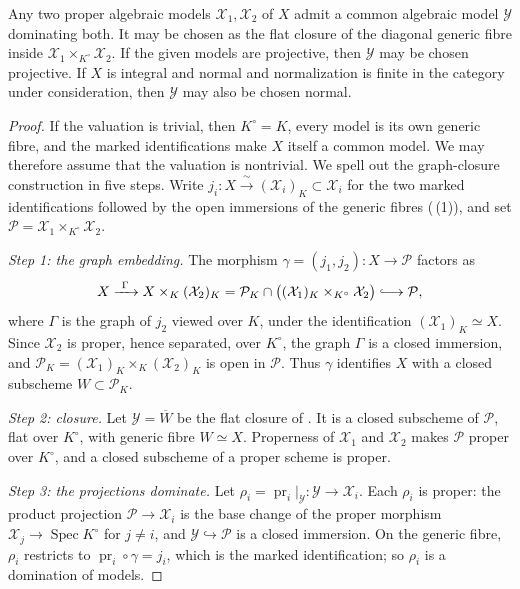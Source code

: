 \begin{proposition}\label{prop:common-domination}
Any two proper algebraic models $\mathcal X_1,\mathcal X_2$ of $X$ admit a
common algebraic model $\mathcal Y$ dominating both.  It may be chosen as
the flat closure of the diagonal generic fibre inside
$\mathcal X_1\times_{K^\circ}\mathcal X_2$.  If the given models are
projective, then $\mathcal Y$ may be chosen projective.  If $X$ is integral
and normal and normalization is finite in the category under consideration,
then $\mathcal Y$ may also be chosen normal.
\end{proposition}
\begin{proof}
If the valuation is trivial, then $K^\circ=K$, every model is its own generic
fibre, and the marked identifications make $X$ itself a common model.  We may
therefore assume that the valuation is nontrivial.  We spell out the
graph-closure construction in five steps.  Write
$j_i:X\xrightarrow{\ \sim\ }(\mathcal X_i)_K\subset\mathcal X_i$ for the
two marked identifications followed by the open immersions of the generic
fibres (\,(1)), and set
$\mathcal P=\mathcal X_1\times_{K^\circ}\mathcal X_2$.

\emph{Step 1: the graph embedding.}  The morphism
$\gamma=(j_1,j_2):X\to\mathcal P$ factors as
\[
   X\xrightarrow{\ \Gamma\ }
   X\times_K(\mathcal X_2)_K
   =\mathcal P_K\cap\bigl((\mathcal X_1)_K\times_{K^\circ}\mathcal X_2\bigr)
   \lhook\joinrel\longrightarrow\mathcal P,
\]
where $\Gamma$ is the graph of $j_2$ viewed over $K$, under the
identification $(\mathcal X_1)_K\simeq X$.  Since $\mathcal X_2$ is proper,
hence separated, over $K^\circ$, the graph $\Gamma$ is a closed immersion,
and $\mathcal P_K=(\mathcal X_1)_K\times_K(\mathcal X_2)_K$ is open in
$\mathcal P$.  Thus $\gamma$ identifies $X$ with a closed subscheme
$W\subset\mathcal P_K$.

\emph{Step 2: closure.}  Let $\mathcal Y=\overline W$ be the flat closure
of .  It is a closed subscheme of
$\mathcal P$, flat over $K^\circ$, with generic fibre $W\simeq X$.
Properness of $\mathcal X_1$ and $\mathcal X_2$ makes $\mathcal P$ proper
over $K^\circ$, and a closed subscheme of a proper scheme is proper.

\emph{Step 3: the projections dominate.}  Let
$\rho_i=\operatorname{pr}_i|_{\mathcal Y}:\mathcal Y\to\mathcal X_i$.  Each
$\rho_i$ is proper: the product projection
$\mathcal P\to\mathcal X_i$ is the base change of the proper morphism
$\mathcal X_j\to\operatorname{Spec}K^\circ$ for $j\ne i$, and
$\mathcal Y\hookrightarrow\mathcal P$ is a closed immersion.  On the
generic fibre, $\rho_i$ restricts to
$\operatorname{pr}_i\circ\gamma=j_i$, which is the marked identification;
so $\rho_i$ is a domination of models.


\end{proof}
